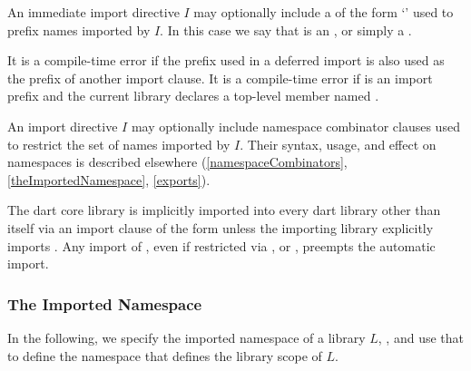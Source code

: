 \documentclass[makeidx]{article}
\begin{document}
{\LMHash{}%
An immediate import directive $I$ may optionally include
a  of the form `\code{\AS{}\,\,\id}' used to prefix
names imported by $I$.
In this case we say that \id{} is an ,
or simply a .


\LMHash{}%
It is a compile-time error if the prefix used in a deferred import
is also used as the prefix of another import clause.
It is a compile-time error if \id{} is an import prefix and
the current library declares a top-level member named \id{}.

\LMHash{}%
An import directive $I$ may optionally include namespace combinator clauses
used to restrict the set of names imported by $I$.
Their syntax, usage, and effect on namespaces is described elsewhere
(\ref{namespaceCombinators}, \ref{theImportedNamespace},
\ref{exports}).

\LMHash{}%
The dart core library 
is implicitly imported into every dart library other than itself
via an import clause of the form
unless the importing library explicitly imports .
Any import of ,
even if restricted via \SHOW{}, \HIDE{} or \AS{},
preempts the automatic import.


\subsubsection{The Imported Namespace}

\LMHash{}%
In the following, we specify the imported namespace of a library $L$,
,
and use that to define the namespace that defines the library scope of $L$.

}
\end{document}
